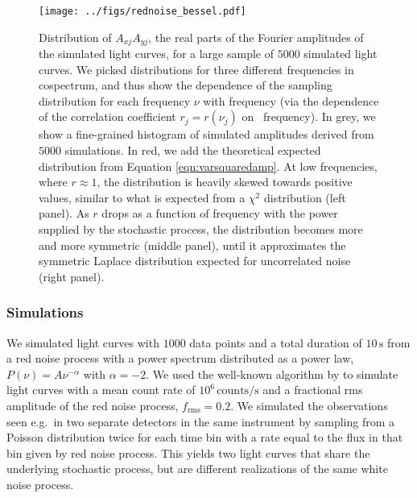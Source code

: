 \documentclass[fleqn,usenatbib]{mnras}
\begin{document}
\begin{figure}
\begin{center}
\texttt{[image: ../figs/rednoise\_bessel.pdf]}
\caption{Distribution of $A_{xj}A_{yj}$, the real parts of the Fourier amplitudes of the simulated light curves, for a large sample of $5000$ simulated light curves. We picked distributions for three different frequencies in cospectrum, and thus show the dependence of the sampling distribution for each frequency $\nu$ with frequency (via the dependence of the correlation coefficient $r_j = r(\nu_j)$ on \ frequency).  In grey, we show a fine-grained histogram of simulated amplitudes derived from $5000$ simulations. In red, we add the theoretical expected distribution from Equation \ref{eqn:varsquaredamp}. At low frequencies, where $r \approx 1$, the distribution is heavily skewed towards positive values, similar to what is expected from a $\chi^2$ distribution (left panel). As $r$ drops as a function of frequency with the power supplied by the stochastic process, the distribution becomes more and more symmetric (middle panel), until it approximates the symmetric Laplace distribution expected for uncorrelated noise (right panel).}
\label{fig:rednoise_bessel}
\end{center}
\end{figure}

\subsubsection{Simulations}
\label{sec:rednoisesims}

We simulated light curves with $1000$ data points and a total duration of $10\,\mathrm{s}$ from a red noise process with a power spectrum distributed as a power law, $P(\nu) = A\nu^{-\alpha}$ with $\alpha=-2$. We used the well-known algorithm by \citet{timmer1995} to simulate light curves with a mean count rate of $10^{6}\,\mathrm{counts}/\mathrm{s}$ and a fractional rms amplitude of the red noise process, $f_\mathrm{rms} = 0.2$. We simulated the observations seen e.g.\ in two separate detectors in the same instrument by sampling from a Poisson distribution twice for each time bin with a rate equal to the flux in that bin given by red noise process. This yields two light curves that share the underlying stochastic process, but are different realizations of the same white noise process.
\end{document}
